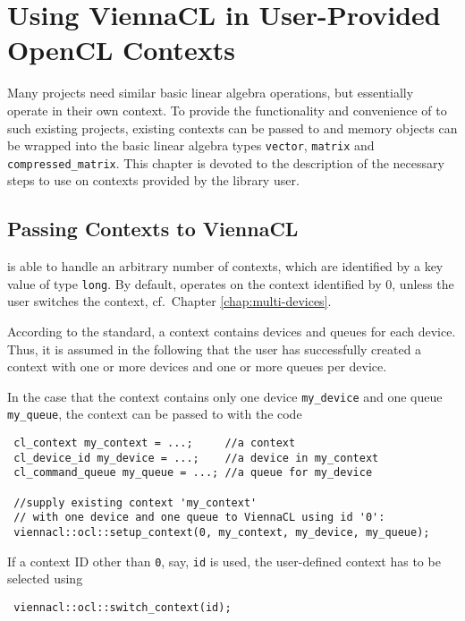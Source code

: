 \chapter{Using ViennaCL in User-Provided OpenCL Contexts} \label{chap:custom-contexts}

Many projects need similar basic linear algebra operations, but essentially operate in their own {\OpenCL} context. 
To provide the functionality and convenience of {\ViennaCL} to such existing projects,
existing contexts can be passed to {\ViennaCL} and memory objects can be wrapped into the basic linear algebra types \lstinline|vector|, \lstinline|matrix| and \lstinline|compressed_matrix|.
This chapter is devoted to the description of the necessary steps to use {\ViennaCL} on contexts provided by the library user.


\section{Passing Contexts to ViennaCL}
{\ViennaCLversion} is able to handle an arbitrary number of contexts, which are identified by a key value of type \lstinline|long|. 
By default, {\ViennaCL} operates on the context identified by $0$, unless the user switches the context, cf.~Chapter \ref{chap:multi-devices}.

According to the {\OpenCL} standard, a context contains devices and queues for each device. Thus, it is assumed in the following that
the user has successfully created a context with one or more devices and one or more queues per device.

In the case that the context contains only one device \lstinline|my_device| and one queue \lstinline|my_queue|, the context can be passed to {\ViennaCL} with the code
\begin{lstlisting}
 cl_context my_context = ...;     //a context
 cl_device_id my_device = ...;    //a device in my_context
 cl_command_queue my_queue = ...; //a queue for my_device

 //supply existing context 'my_context'
 // with one device and one queue to ViennaCL using id '0':
 viennacl::ocl::setup_context(0, my_context, my_device, my_queue);
\end{lstlisting}
If a context ID other than \texttt{0}, say, \lstinline|id| is used, the user-defined context has to be selected using
\begin{lstlisting}
 viennacl::ocl::switch_context(id);
\end{lstlisting}

